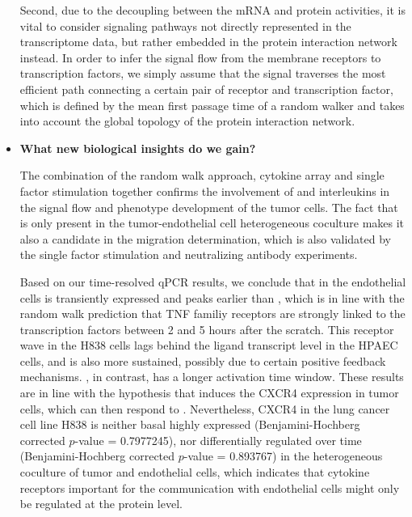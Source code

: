 \begin{itemize}
Second, due to the decoupling between the mRNA and protein
activities, it is vital to consider signaling pathways not directly represented
in the transcriptome data, but rather embedded in the protein interaction network
instead. In order to infer the signal flow from the membrane receptors to 
transcription factors, we simply assume that the signal traverses the most efficient
path connecting a certain pair of receptor and transcription factor, which is 
defined by the mean first passage time of a random walker and takes into account
the global topology of the protein interaction network.

\item \textbf{What new  biological insights do we gain?}

The combination of the random walk approach, cytokine array and single factor
stimulation together confirms the involvement of \tnfa and interleukins in the
signal flow and phenotype development of the tumor cells. The fact that \sdfonea
is only present in the tumor-endothelial cell heterogeneous coculture makes it
also a candidate in the migration determination, which is also validated by the 
single factor stimulation and neutralizing antibody experiments.

Based on our time-resolved qPCR results, we conclude that \tnfa in the endothelial 
cells is 
transiently expressed and peaks earlier than \sdfonea, which is in line with
the random walk prediction that TNF familiy receptors are strongly linked to
the transcription factors between 2 and 5 hours after the scratch. This receptor
wave in the H838 cells lags behind the ligand transcript level in the HPAEC cells,
and is also more sustained, possibly due to certain positive feedback mechanisms.
\sdfonea, in contrast, has
a longer activation time window. These results are in line with the hypothesis 
that \tnfa induces the CXCR4 expression in tumor cells, which can then respond
to \sdfonea. Nevertheless, CXCR4 in the lung cancer cell line H838 is neither
basal highly expressed (Benjamini-Hochberg corrected $p$-value = 0.7977245), nor differentially regulated over time (Benjamini-Hochberg
corrected $p$-value = 0.893767) in the 
heterogeneous coculture of tumor and endothelial cells, which indicates that
cytokine receptors important for the communication with endothelial cells might
only be regulated at the protein level.


\end{itemize}
